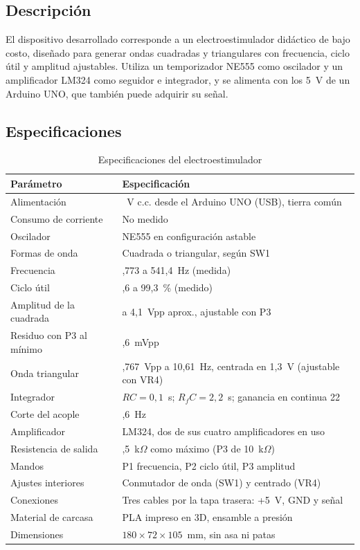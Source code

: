 \documentclass[conference]{IEEEtran}
\begin{document}
\subsection{Descripción}

El dispositivo desarrollado corresponde a un electroestimulador didáctico de bajo costo, diseñado para generar ondas cuadradas y triangulares con frecuencia, ciclo útil y amplitud ajustables. Utiliza un temporizador NE555 como oscilador y un amplificador LM324 como seguidor e integrador, y se alimenta con los 5~V de un Arduino UNO, que también puede adquirir su señal.

\subsection{Especificaciones}

\begin{table}[!t]
\caption{Especificaciones del electroestimulador}
\label{tab:especificaciones}
\centering
\begin{tabular}{>{\raggedright\arraybackslash}p{} >{\raggedright\arraybackslash}p{}}
\hline
\textbf{Parámetro} & \textbf{Especificación} \\
\hline
Alimentación & 5~V c.c. desde el Arduino UNO (USB), tierra común \\
Consumo de corriente & No medido \\
Oscilador & NE555 en configuración astable \\
Formas de onda & Cuadrada o triangular, según SW1 \\
Frecuencia & 4,773 a 541,4~Hz (medida) \\
Ciclo útil & 49,6 a 99,3~\% (medido) \\
Amplitud de la cuadrada & 0 a 4,1~Vpp aprox., ajustable con P3 \\
Residuo con P3 al mínimo & 14,6~mVpp \\
Onda triangular & 0,767~Vpp a 10,61~Hz, centrada en 1,3~V (ajustable con VR4) \\
Integrador & $RC = 0{,}1$~s; $R_fC = 2{,}2$~s; ganancia en continua 22 \\
Corte del acople & 1,6~Hz \\
Amplificador & LM324, dos de sus cuatro amplificadores en uso \\
Resistencia de salida & 2,5~k$\Omega$ como máximo (P3 de 10~k$\Omega$) \\
Mandos & P1 frecuencia, P2 ciclo útil, P3 amplitud \\
Ajustes interiores & Conmutador de onda (SW1) y centrado (VR4) \\
Conexiones & Tres cables por la tapa trasera: +5~V, GND y señal \\
Material de carcasa & PLA impreso en 3D, ensamble a presión \\
Dimensiones & $180 \times 72 \times 105$~mm, sin asa ni patas \\
\hline
\end{tabular}
\end{table}
\end{document}
